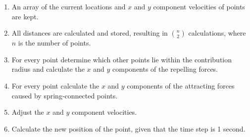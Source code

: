 \documentclass[11pt]{article} %
\begin{document}
\begin{enumerate}
\item An array of the current locations and $x$ and $y$ component velocities of points are kept.
\item All distances are calculated and stored, resulting in $n \choose 2$ calculations, where $n$ is the number of points.
\item For every point determine which other points lie within the contribution radius and calculate the $x$ and $y$ components of the repelling forces.
\item For every point calculate the $x$ and $y$ components of the attracting forces caused by spring-connected points.
\item Adjust the $x$ and $y$ component velocities.
\item Calculate the new position of the point, given that the time step is 1 second.
\end{enumerate}
\end{document}
